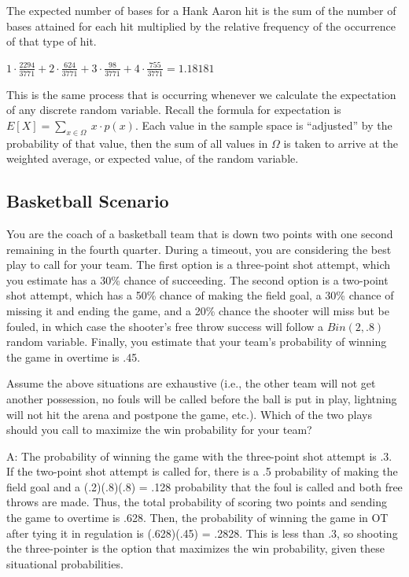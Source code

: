 \documentclass[
  11pt,
]{book}
\theoremstyle{definition}
\theoremstyle{definition}
\theoremstyle{definition}
\theoremstyle{definition}
\theoremstyle{remark}
\begin{document}
The expected number of bases for a Hank Aaron hit is the sum of the number of bases attained for each hit multiplied by the relative frequency of the occurrence of that type of hit.

\(1 \cdot \frac{2294}{3771} + 2 \cdot \frac{624}{3771} + 3 \cdot \frac{98}{3771} + 4 \cdot \frac{755}{3771} = 1.18181\)

This is the same process that is occurring whenever we calculate the expectation of any discrete random variable. Recall the formula for expectation is \(E[X] = \sum_{x \in \Omega}\ x \cdot p(x)\). Each value in the sample space is ``adjusted'' by the probability of that value, then the sum of all values in \(\Omega\) is taken to arrive at the weighted average, or expected value, of the random variable.

\hypertarget{basketball-scenario}{%
\subsection{Basketball Scenario}\label{basketball-scenario}}

You are the coach of a basketball team that is down two points with one second remaining in the fourth quarter. During a timeout, you are considering the best play to call for your team. The first option is a three-point shot attempt, which you estimate has a 30\% chance of succeeding. The second option is a two-point shot attempt, which has a 50\% chance of making the field goal, a 30\% chance of missing it and ending the game, and a 20\% chance the shooter will miss but be fouled, in which case the shooter's free throw success will follow a \(Bin(2, .8)\) random variable. Finally, you estimate that your team's probability of winning the game in overtime is .45.

Assume the above situations are exhaustive (i.e., the other team will not get another possession, no fouls will be called before the ball is put in play, lightning will not hit the arena and postpone the game, etc.). Which of the two plays should you call to maximize the win probability for your team?

A: The probability of winning the game with the three-point shot attempt is .3. If the two-point shot attempt is called for, there is a .5 probability of making the field goal and a (.2)(.8)(.8) = .128 probability that the foul is called and both free throws are made. Thus, the total probability of scoring two points and sending the game to overtime is .628. Then, the probability of winning the game in OT after tying it in regulation is (.628)(.45) = .2828. This is less than .3, so shooting the three-pointer is the option that maximizes the win probability, given these situational probabilities.
\end{document}
